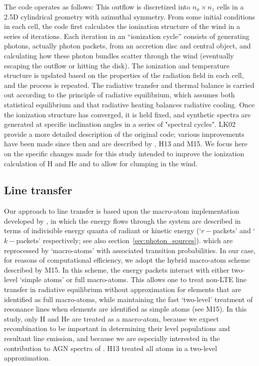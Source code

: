 \documentclass[useAMS,usenatbib]{mn2e_x}
\begin{document}
The code operates as follows:   This outflow is discretized into $n_x \times n_z$ cells in a 2.5D
cylindrical geometry with azimuthal symmetry. From some initial conditions in each cell, the code first calculates the ionization structure of the wind in a series of iterations.  Each iteration in an ``ionization cycle'' consists of generating photons, actually photon packets, 
from an accretion disc and central object, and calculating how these photon 
bundles scatter through the wind (eventually escaping the outflow or hitting the disk). 
The ionization and temperature structure is updated based on the properties of the 
radiation field in each cell, and the process is repeated. The radiative transfer and thermal
balance is carried out according to the principle of radiative equilibrium, 
which assumes both statistical equilibrium and that radiative heating balances radiative cooling.
Once the ionization structure has converged, it is held fixed, 
and synthetic spectra are generated at specific inclination 
angles in a series of "spectral cycles". LK02 provide a more detailed  
description of the original code; various improvements have been made 
since then and are described by \cite{simmacro2005}, H13 and M15.  
We focus here on the specific changes made for this study
intended to improve the ionization calculation of H and He
and to allow for clumping in the wind.


\subsection{Line transfer}

Our approach to line transfer is based upon the macro-atom implementation developed by 
\cite{lucy2002, lucy2003}, in which the energy flows through the system are described in 
terms of indivisible energy quanta of radiant or kinetic energy 
(`$r-$packets' and `$k-$packets' respectively; see also section~\ref{sec:photon_sources}). 
which are reprocessed by `macro-atoms' with associated transition probabilities.
In our case, for reasons of computational efficiency, we adopt the  hybrid macro-atom scheme 
described by M15. In this scheme, the energy packets interact with either two-level 
`simple atoms' or full macro-atoms. 
This allows one to treat non-LTE line transfer in radiative equilibrium
without approximation for elements that are identified as 
full macro-atoms, while maintaining the fast `two-level' 
treatment of resonance lines when elements are identified 
as simple atoms (see M15). In this study,
only H and He are treated as a macro-atom, because 
we expect recombination to be important
in determining their level populations and resultant line emission, 
and because we are especially interested in the contribution to 
AGN spectra of \LA.  H13 treated all atoms in a two-level approximation.  
\end{document}
